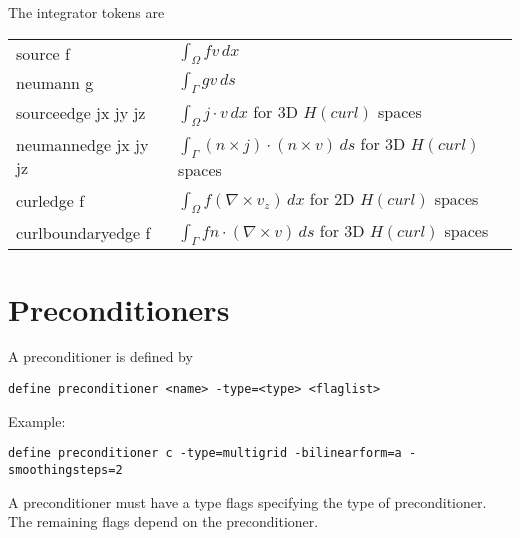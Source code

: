 \documentclass[12pt]{book}
\begin{document}
The integrator tokens are \newline
\begin{tabular}{|l|l|}
\hline
source f     &    $\int_\Omega f  v \, dx$ \\
neumann g     &    $\int_\Gamma g  v \, ds$ \\
\hline
sourceedge jx jy jz  &    $\int_\Omega j \cdot v \, dx$  for 3D $H(curl)$ spaces \\
neumannedge jx jy jz  &    $\int_\Gamma (n \times j) \cdot (n \times v) \, ds$  for 3D $H(curl)$ spaces \\
curledge f  &   $\int_\Omega f (\nabla \times v_z) \, dx$  for 2D $H(curl)$ spaces \\
curlboundaryedge f  &    $\int_\Gamma f n \cdot (\nabla \times v) \, ds$  for 3D $H(curl)$ spaces \\
\hline
\end{tabular}






\section{Preconditioners}
A preconditioner is defined by
\begin{verbatim}
define preconditioner <name> -type=<type> <flaglist>
\end{verbatim}
Example:
\begin{verbatim}
define preconditioner c -type=multigrid -bilinearform=a -smoothingsteps=2
\end{verbatim}
A preconditioner must have a type flags specifying the type of preconditioner.
The remaining flags depend on the preconditioner.
\end{document}

